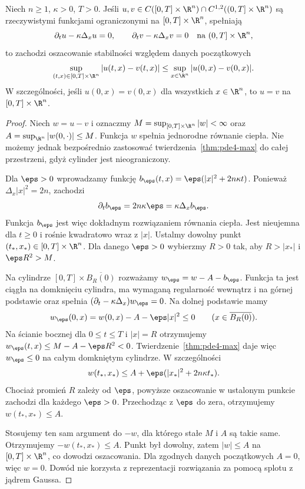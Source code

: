 \begin{twierdzenie}
\label{thm:pde4-global-uniqueness}
Niech $n\geq1$, $\kappa>0$, $T>0$. Jeśli
$u,v\in C([0,T]\times\R^n)\cap
C^{1,2}((0,T]\times\R^n)$ są rzeczywistymi
funkcjami ograniczonymi na $[0,T]\times\R^n$,
spełniają
\[
 \partial_tu-\kappa\Delta_xu=0,\qquad
 \partial_tv-\kappa\Delta_xv=0
 \quad\text{na }(0,T]\times\R^n,
\]
to zachodzi oszacowanie stabilności względem
danych początkowych
\[
 \sup_{(t,x)\in[0,T]\times\R^n}|u(t,x)-v(t,x)|
 \leq\sup_{x\in\R^n}|u(0,x)-v(0,x)|.
\]
W szczególności, jeśli $u(0,x)=v(0,x)$ dla wszystkich
$x\in\R^n$, to $u=v$ na $[0,T]\times\R^n$.
\end{twierdzenie}
\begin{proof}
Niech $w=u-v$ i oznaczmy
$M=\sup_{[0,T]\times\R^n}|w|<\infty$ oraz
$A=\sup_{\R^n}|w(0,\cdot)|\leq M$.
Funkcja $w$ spełnia jednorodne równanie ciepła.
Nie możemy jednak bezpośrednio zastosować
twierdzenia~\ref{thm:pde4-max} do całej przestrzeni,
gdyż cylinder jest nieograniczony.

Dla $\eps>0$ wprowadzamy funkcję
$b_\eps(t,x)=\eps(|x|^2+2n\kappa t)$.
Ponieważ $\Delta_x|x|^2=2n$, zachodzi
\[
 \partial_tb_\eps=2n\kappa\eps
 =\kappa\Delta_xb_\eps.
\]
Funkcja $b_\eps$ jest więc dokładnym rozwiązaniem
równania ciepła. Jest nieujemna dla $t\geq0$
i rośnie kwadratowo wraz z $|x|$.
Ustalmy dowolny punkt $(t_*,x_*)\in[0,T]\times\R^n$.
Dla danego $\eps>0$ wybierzmy $R>0$ tak, aby
$R>|x_*|$ i $\eps R^2>M$.

Na cylindrze $[0,T]\times\overline{B_R(0)}$
rozważamy $w_\eps=w-A-b_\eps$.
Funkcja ta jest ciągła na domknięciu cylindra,
ma wymaganą regularność wewnątrz i na górnej
podstawie oraz spełnia
$(\partial_t-\kappa\Delta_x)w_\eps=0$.
Na dolnej podstawie mamy
\[
 w_\eps(0,x)=w(0,x)-A-\eps|x|^2\leq0
 \qquad(x\in\overline{B_R(0)}).
\]
Na ścianie bocznej dla $0\leq t\leq T$ i $|x|=R$
otrzymujemy
$w_\eps(t,x)\leq M-A-\eps R^2<0$.
Twierdzenie~\ref{thm:pde4-max} daje więc
$w_\eps\leq0$ na całym domkniętym cylindrze.
W szczególności
\[
 w(t_*,x_*)\leq A+\eps(|x_*|^2+2n\kappa t_*).
\]
Chociaż promień $R$ zależy od $\eps$, powyższe
oszacowanie w ustalonym punkcie zachodzi dla
każdego $\eps>0$. Przechodząc z $\eps$ do zera,
otrzymujemy $w(t_*,x_*)\leq A$.

Stosujemy ten sam argument do $-w$, dla którego
stałe $M$ i $A$ są takie same. Otrzymujemy
$-w(t_*,x_*)\leq A$. Punkt był dowolny, zatem
$|w|\leq A$ na $[0,T]\times\R^n$, co dowodzi
oszacowania. Dla zgodnych danych początkowych
$A=0$, więc $w=0$.
Dowód nie korzysta z reprezentacji rozwiązania
za pomocą splotu z jądrem Gaussa.
\end{proof}

